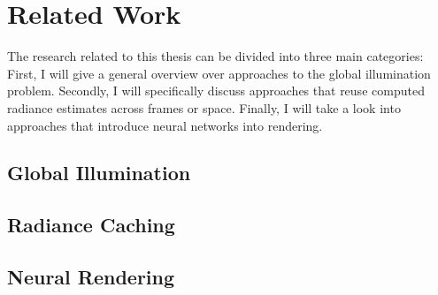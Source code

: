 
\chapter{Related Work}
\label{chap:related}
The research related to this thesis can be divided into three main categories:
First, I will give a general overview over approaches to the global illumination problem.
Secondly, I will specifically discuss approaches that reuse computed radiance estimates across frames or space.
Finally, I will take a look into approaches that introduce neural networks into rendering.

\section{Global Illumination}

\section{Radiance Caching}

\section{Neural Rendering}